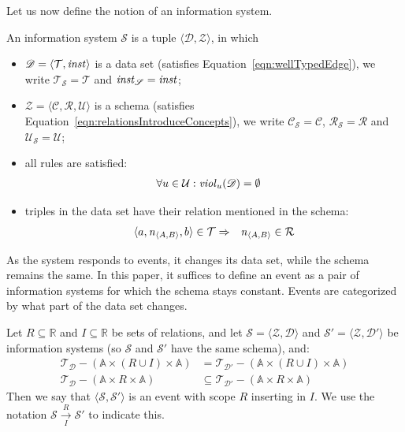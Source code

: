 \documentclass[runningheads]{llncs}
\newcommand{\id}[1]{\text{\it #1\/}}
\newcommand{\instance}{\mathbin{\id{inst}}}
\newcommand{\viol}[2]{\violC{#1}(#2)}
\newcommand{\violC}[1]{\id{viol}_{#1}}
\newcommand{\declare}[3]{\id{#1}_{\pair{#2}{#3}}}
\newcommand{\pair}[2]{\langle{#1},{#2}\rangle}
\newcommand{\triple}[3]{\langle{#1},{#2},{#3}\rangle}
\newcommand{\Atoms}{\mathbb{A}}
\newcommand{\concepts}{\mathcal{C}}
\newcommand{\rels}{\mathcal{R}}   %
\newcommand{\Rels}{\mathbb{R}}   %
\newcommand{\triples}{\mathcal{T}}
\newcommand{\Triple}[3]{#1\times#2\times#3}
\newcommand{\rules}{\mathcal{U}}
\newcommand{\dataset}{\mathscr{D}}
\newcommand{\schema}{\mathscr{Z}}
\newcommand{\infsys}{\mathscr{S}}
\def\define#1{\label{dfn:#1}{\em #1}\index{#1}}
\begin{document}
   Let us now define the notion of an information system.
\begin{definition}
\label{def:information system}
\item An information system $\infsys$ is a tuple $\pair{\dataset}{\schema}$, in which
\begin{itemize}
   \item $\dataset=\pair{\triples}{\instance}$ is a data set (satisfies Equation~\ref{eqn:wellTypedEdge}), we write $\triples_\infsys = \triples$ and $\instance_\infsys = \instance$;
   \item $\schema=\triple{\concepts}{\rels}{\rules}$ is a schema (satisfies Equation~\ref{eqn:relationsIntroduceConcepts}), we write $\concepts_\infsys = \concepts$, $\rels_\infsys = \rels$ and $\rules_\infsys=\rules$;
   \item all rules are satisfied:
   \begin{eqnarray}
   \forall u\in\rules&:\viol{u}{\dataset}=\emptyset
   \label{eqn:satisfaction}
   \end{eqnarray}
   \item triples in the data set have their relation mentioned in the schema:
   \begin{eqnarray}
   \triple{a}{\declare{n}{A}{B}}{b}\in\triples&\Rightarrow&\declare{n}{A}{B}\in\rels
   \label{eqn:define R}
   \end{eqnarray}
\end{itemize}
\end{definition}

   As the system responds to events, it changes its data set, while the schema remains the same.
   In this paper, it suffices to define an event as a pair of information systems for which the schema stays constant.
   Events are categorized by what part of the data set changes.
   
   \begin{definition}[Event]
   Let $R \subseteq \Rels$ and $I \subseteq \Rels$ be sets of relations, and let $\infsys = \pair{\schema}{\dataset}$ and $\infsys' = \pair{\schema}{\dataset'}$ be information systems (so $\infsys$ and $\infsys'$ have the same schema), and:
      \begin{align}
      \triples_{\dataset} - (\Triple{\Atoms}{(R \cup I)}{\Atoms}) &= \triples_{\dataset'} - (\Triple{\Atoms}{(R \cup I)}{\Atoms})
   \label{eqn:eventUnchanged}\\
      \triples_{\dataset} - (\Triple{\Atoms}{R}{\Atoms}) &\subseteq \triples_{\dataset'} - (\Triple{\Atoms}{R}{\Atoms})
   \label{eqn:eventInsert}
   \end{align}
   Then we say that $\pair{\infsys}{\infsys'}$ is an event with scope $R$ inserting in $I$.
   We use the notation $\infsys \xrightarrow[I]{R} \infsys'$ to indicate this.
   \end{definition}
   
\end{document}
